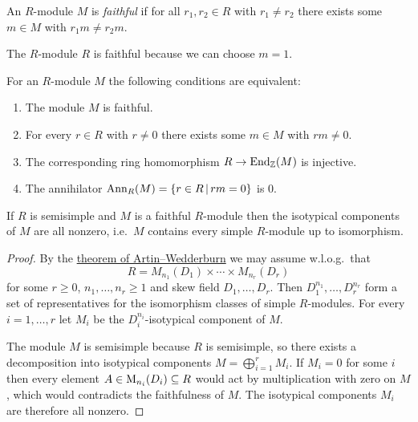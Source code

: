 \begin{definition}
  An $R$-module $M$ is \emph{faithful} if for all $r_1, r_2 \in R$ with $r_1 \neq r_2$ there exists some $m \in M$ with $r_1 m \neq r_2 m$.
\end{definition}


\begin{example}
  The $R$-module $R$ is faithful because we can choose $m = 1$.
\end{example}


\begin{recall}
  For an $R$-module $M$ the following conditions are equivalent:
  \begin{enumerate}
    \item
      The module $M$ is faithful.
    \item
      For every $r \in R$ with $r \neq 0$ there exists some $m \in M$ with $rm \neq 0$.
    \item
      The corresponding ring homomorphism $R \to \operatorname{End}_{\mathbb{Z}}(M)$ is injective.
    \item
      The annihilator $\Ann_R(M) = \{r \in R \suchthat rm = 0\}$ is $0$.
  \end{enumerate}
\end{recall}


\begin{corollary}
  \label{corollary: faithful over ss contains ever simple}
  If $R$ is semisimple and $M$ is a faithful $R$-module then the isotypical components of $M$ are all nonzero, i.e.\ $M$ contains every simple $R$-module up to isomorphism.
\end{corollary}


\begin{proof}
  By the \hyperref[theorem: artin wedderburn theorem]{theorem of Artin--Wedderburn} we may assume w.l.o.g.\ that
  \[
    R = M_{n_1}(D_1) \times \dotsb \times M_{n_r}(D_r)
  \]
  for some $r \geq 0$, $n_1, \dotsc, n_r \geq 1$ and skew field $D_1, \dotsc, D_r$.
  Then $D_1^{n_1}, \dotsc, D_r^{n_r}$ form a set of representatives for the isomorphism classes of simple $R$-modules.
  For every $i = 1, \dotsc, r$ let $M_i$ be the $D_i^{n_i}$-isotypical component of $M$.
  
  The module $M$ is semisimple because $R$ is semisimple, so there exists a decomposition into isotypical components $M = \bigoplus_{i=1}^r M_i$.
  If $M_i = 0$ for some $i$ then every element $A \in \operatorname{M}_{n_i}(D_i) \subseteq R$ would act by multiplication with zero on $M$, which would contradicts the faithfulness of $M$.
  The isotypical components $M_i$ are therefore all nonzero.
\end{proof}




